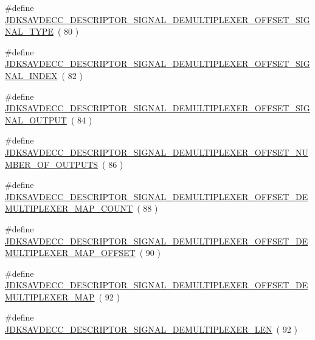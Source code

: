 \begin{DoxyCompactItemize}
\item 
\#define \hyperlink{group__descriptor__signal__demultiplexer_ga06fe88f4143cfc9b3018d3d93ce9c2a3}{J\+D\+K\+S\+A\+V\+D\+E\+C\+C\+\_\+\+D\+E\+S\+C\+R\+I\+P\+T\+O\+R\+\_\+\+S\+I\+G\+N\+A\+L\+\_\+\+D\+E\+M\+U\+L\+T\+I\+P\+L\+E\+X\+E\+R\+\_\+\+O\+F\+F\+S\+E\+T\+\_\+\+S\+I\+G\+N\+A\+L\+\_\+\+T\+Y\+PE}~( 80 )
\item 
\#define \hyperlink{group__descriptor__signal__demultiplexer_ga8cf1c5d922a9dd32e367954a5122d9c3}{J\+D\+K\+S\+A\+V\+D\+E\+C\+C\+\_\+\+D\+E\+S\+C\+R\+I\+P\+T\+O\+R\+\_\+\+S\+I\+G\+N\+A\+L\+\_\+\+D\+E\+M\+U\+L\+T\+I\+P\+L\+E\+X\+E\+R\+\_\+\+O\+F\+F\+S\+E\+T\+\_\+\+S\+I\+G\+N\+A\+L\+\_\+\+I\+N\+D\+EX}~( 82 )
\item 
\#define \hyperlink{group__descriptor__signal__demultiplexer_ga49be996928e530032ded0c184765215e}{J\+D\+K\+S\+A\+V\+D\+E\+C\+C\+\_\+\+D\+E\+S\+C\+R\+I\+P\+T\+O\+R\+\_\+\+S\+I\+G\+N\+A\+L\+\_\+\+D\+E\+M\+U\+L\+T\+I\+P\+L\+E\+X\+E\+R\+\_\+\+O\+F\+F\+S\+E\+T\+\_\+\+S\+I\+G\+N\+A\+L\+\_\+\+O\+U\+T\+P\+UT}~( 84 )
\item 
\#define \hyperlink{group__descriptor__signal__demultiplexer_gab838c2f040ce2490f2b1b01d4fa65a19}{J\+D\+K\+S\+A\+V\+D\+E\+C\+C\+\_\+\+D\+E\+S\+C\+R\+I\+P\+T\+O\+R\+\_\+\+S\+I\+G\+N\+A\+L\+\_\+\+D\+E\+M\+U\+L\+T\+I\+P\+L\+E\+X\+E\+R\+\_\+\+O\+F\+F\+S\+E\+T\+\_\+\+N\+U\+M\+B\+E\+R\+\_\+\+O\+F\+\_\+\+O\+U\+T\+P\+U\+TS}~( 86 )
\item 
\#define \hyperlink{group__descriptor__signal__demultiplexer_gab99f652dcbb36bdb592c7e9d2889e935}{J\+D\+K\+S\+A\+V\+D\+E\+C\+C\+\_\+\+D\+E\+S\+C\+R\+I\+P\+T\+O\+R\+\_\+\+S\+I\+G\+N\+A\+L\+\_\+\+D\+E\+M\+U\+L\+T\+I\+P\+L\+E\+X\+E\+R\+\_\+\+O\+F\+F\+S\+E\+T\+\_\+\+D\+E\+M\+U\+L\+T\+I\+P\+L\+E\+X\+E\+R\+\_\+\+M\+A\+P\+\_\+\+C\+O\+U\+NT}~( 88 )
\item 
\#define \hyperlink{group__descriptor__signal__demultiplexer_ga325a5c8870ff9ba4d48dafe01818e709}{J\+D\+K\+S\+A\+V\+D\+E\+C\+C\+\_\+\+D\+E\+S\+C\+R\+I\+P\+T\+O\+R\+\_\+\+S\+I\+G\+N\+A\+L\+\_\+\+D\+E\+M\+U\+L\+T\+I\+P\+L\+E\+X\+E\+R\+\_\+\+O\+F\+F\+S\+E\+T\+\_\+\+D\+E\+M\+U\+L\+T\+I\+P\+L\+E\+X\+E\+R\+\_\+\+M\+A\+P\+\_\+\+O\+F\+F\+S\+ET}~( 90 )
\item 
\#define \hyperlink{group__descriptor__signal__demultiplexer_ga2cc54df8c20458f440efc8e7417af01c}{J\+D\+K\+S\+A\+V\+D\+E\+C\+C\+\_\+\+D\+E\+S\+C\+R\+I\+P\+T\+O\+R\+\_\+\+S\+I\+G\+N\+A\+L\+\_\+\+D\+E\+M\+U\+L\+T\+I\+P\+L\+E\+X\+E\+R\+\_\+\+O\+F\+F\+S\+E\+T\+\_\+\+D\+E\+M\+U\+L\+T\+I\+P\+L\+E\+X\+E\+R\+\_\+\+M\+AP}~( 92 )
\item 
\#define \hyperlink{group__descriptor__signal__demultiplexer_ga359e8ecd2c1c5ab25eb590c5dc3998ad}{J\+D\+K\+S\+A\+V\+D\+E\+C\+C\+\_\+\+D\+E\+S\+C\+R\+I\+P\+T\+O\+R\+\_\+\+S\+I\+G\+N\+A\+L\+\_\+\+D\+E\+M\+U\+L\+T\+I\+P\+L\+E\+X\+E\+R\+\_\+\+L\+EN}~( 92 )
\end{DoxyCompactItemize}
